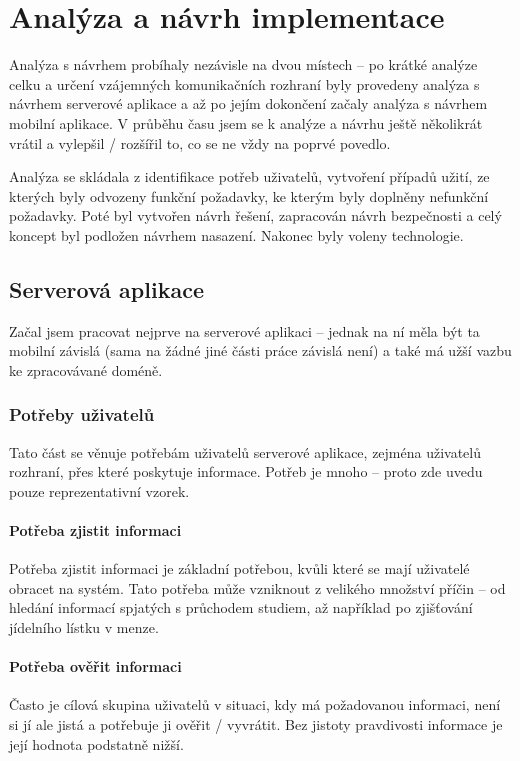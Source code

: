 
\chapter{Analýza a návrh implementace}
Analýza s návrhem probíhaly nezávisle na dvou místech -- po krátké analýze celku a určení vzájemných komunikačních rozhraní byly provedeny analýza s návrhem serverové aplikace a až po jejím dokončení začaly analýza s návrhem mobilní aplikace. V průběhu času jsem se k analýze a návrhu ještě několikrát vrátil a vylepšil / rozšířil to, co se ne vždy na poprvé povedlo.

Analýza se skládala z identifikace potřeb uživatelů, vytvoření případů užití, ze kterých byly odvozeny funkční požadavky, ke kterým byly doplněny nefunkční požadavky. Poté byl vytvořen návrh řešení, zapracován návrh bezpečnosti a celý koncept byl podložen návrhem nasazení. Nakonec byly voleny technologie.

\section{Serverová aplikace}
Začal jsem pracovat nejprve na serverové aplikaci -- jednak na ní měla být ta mobilní závislá (sama na žádné jiné části práce závislá není) a také má užší vazbu ke zpracovávané doméně.


\subsection{Potřeby uživatelů}
\label{sec:server:needs}
Tato část se věnuje potřebám uživatelů serverové aplikace, zejména uživatelů rozhraní, přes které poskytuje informace. Potřeb je mnoho -- proto zde uvedu pouze reprezentativní vzorek.

\subsubsection{Potřeba zjistit informaci}
Potřeba zjistit informaci je základní potřebou, kvůli které se mají uživatelé obracet na systém. Tato potřeba může vzniknout z velikého množství příčin -- od hledání informací spjatých s průchodem studiem, až například po zjišťování jídelního lístku v menze.

\subsubsection{Potřeba ověřit informaci}
Často je cílová skupina uživatelů v situaci, kdy má požadovanou informaci, není si jí ale jistá a potřebuje ji ověřit / vyvrátit. Bez jistoty pravdivosti informace je její hodnota podstatně nižší.

